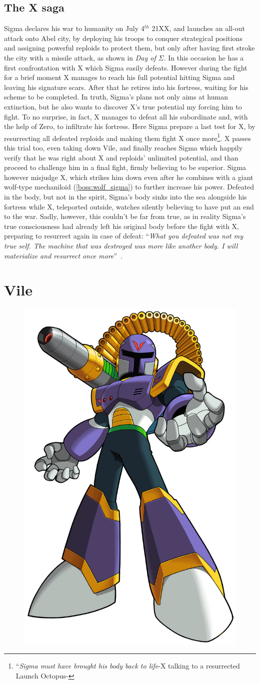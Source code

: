 \section{The X saga}
Sigma declares his war to humanity on July 4$^{th}$ 21XX, and launches an all-out attack onto Abel city, by deploying his troops to conquer strategical positions and assigning powerful reploids to protect them, but only after having first stroke the city  with a missile attack, as shown in \textit{Day of $\Sigma$}. In this occasion he has a first confrontation with X which Sigma easily defeats. However during the fight for a brief moment X manages to reach his full potential hitting Sigma and leaving his signature scars. After that he retires
into his fortress, waiting for his scheme to be completed. In truth, Sigma's plans not only aims at human extinction, but he also wants to discover X's true potential my forcing him to fight. To no surprise, in fact, X manages to defeat all his subordinate and, with the help of Zero, to infiltrate his fortress. Here Sigma prepare a last test for X, by resurrecting all defeated reploids and making them fight X once more\footnote{``\textit{Sigma must have brought his body back to life}-X talking to a resurrected Launch Octopus-\cite{wiki:MM_MHX_script}}. X passes this trial too, even taking down Vile, and finally reaches Sigma which happily verify that he was right about X and reploids' unlimited potential, and than proceed to challenge him in a final fight, firmly believing to be superior. Sigma however misjudge X, which strikes him down even after he combines with a giant wolf-type mechaniloid (\ref{boss:wolf_sigma}) to further increase his power. Defeated in the body, but not in the spirit, Sigma's body sinks into the sea alongside his fortress while X, teleported outside, watches silently believing to have put an end to the war. Sadly, however, this couldn't be far from true, as in reality Sigma's true consciousness had already left his original body before the fight with X, preparing to resurrect again in case of defeat: ``\textit{What you defeated was not my true self. The machine that was destroyed was more like another body. I will materialize and resurrect once more}''~\cite{wordpress:X_japanese_script}.

\chapter{Vile}\label{char:Vile}
\begin{figure}[h]
	\centering
	\includegraphics[width=0.3\linewidth]{figures/X1/Sigma_stages/MhxVile.png}	
\end{figure}


